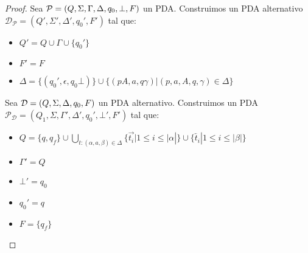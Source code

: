 \documentclass[a4paper,twoside,master.tex]{article}
\begin{document}
\begin{proof}
    Sea $\mathcal{P} = (Q, \Sigma, \Gamma, \Delta, q_0, \bot, F)$ un PDA. Construimos un PDA alternativo $\mathcal{D}_\mathcal{P} = (Q', \Sigma', \Delta', q_0', F')$ tal que:
    \begin{itemize}
        \item $Q' = Q \cup \Gamma \cup \{ q_0' \}$
        \item $F' = F$
        \item $\Delta = \{ (q_0', \epsilon, q_0\bot) \} \cup \{ (pA, a, q\gamma) | (p,a,A, q, \gamma) \in \Delta \}$
    \end{itemize}


    Sea $\mathcal{D} = (Q, \Sigma, \Delta, q_0, F)$ un PDA alternativo. Construimos  un PDA $\mathcal{P}_\mathcal{D} = (Q_1, \Sigma, \Gamma', \Delta', q_0', \bot', F')$ tal que:
    \begin{itemize}
        \item $Q = \{ q, q_f \} \cup \bigcup\limits_{t:(\alpha,a,\beta) \in \Delta} \{ \vec{t_i} | 1 \le i \le |\alpha| \} \cup \{ \overleftarrow{t_i} | 1 \le i \le |\beta| \}$
        \item $\Gamma' = Q$
        \item $\bot' = q_0$
        \item $q_0' = q$
        \item $F = \{ q_f \}$
    \end{itemize}

\end{proof}
\end{document}
